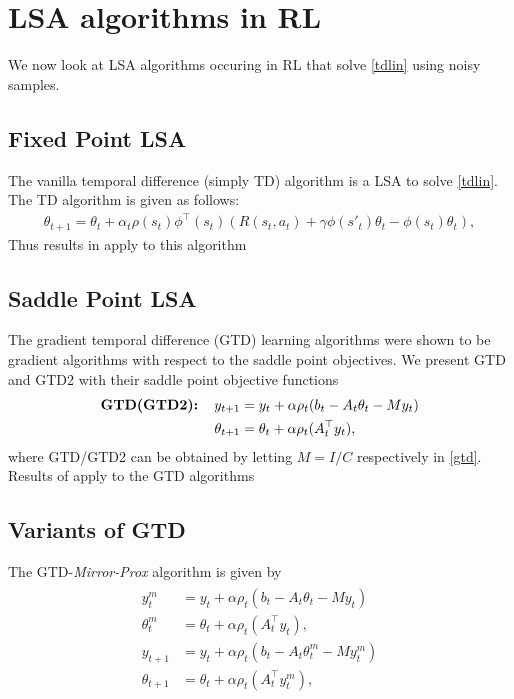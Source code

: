 \section{LSA algorithms in RL}
We now look at LSA algorithms occuring in RL that solve \eqref{tdlin} using noisy samples.
\subsection{Fixed Point LSA}
The vanilla temporal difference (simply TD) algorithm is a LSA to solve \eqref{tdlin}. The TD algorithm is given as follows:
\begin{align}\label{vtd}
\theta_{t+1}=\theta_t+\alpha_t \rho(s_t)\phi^\top(s_t)(R(s_t,a_t)+\gamma \phi(s'_t)\theta_t- \phi(s_t)\theta_t),
\end{align}
Thus results in  apply to this algorithm
\subsection{Saddle Point LSA}
The gradient temporal difference (GTD) learning algorithms were shown to be gradient algorithms with respect to the saddle point objectives. We present GTD and GTD2 with their saddle point objective functions
\begin{align}\label{gtd}
\begin{split}
\textbf{GTD(GTD2):\quad}y_{t+1}&=y_t+\alpha \rho_t(b_t-A_t\theta_t - M y_t)\\
\theta_{t+1}&=\theta_t+\alpha\rho_t(A^\top_ty_t),
\end{split}
\end{align}
where GTD/GTD2 can be obtained by letting $M=I/C$ respectively in \eqref{gtd}. Results of  apply to the GTD algorithms
\subsection{Variants of GTD}
The GTD-\emph{Mirror-Prox} algorithm is given by
\begin{align}
\begin{split}
y^m_{t}&=y_t+\alpha \rho_t(b_t-A_t\theta_t - M y_t)\\
\theta^m_{t}&=\theta_t+\alpha\rho_t(A^\top_ty_t),\\
y_{t+1}&=y_t+\alpha \rho_t(b_t-A_t\theta^m_t - M y^m_t)\\
\theta_{t+1}&=\theta_t+\alpha\rho_t(A^\top_ty^m_t),
\end{split}
\end{align}

